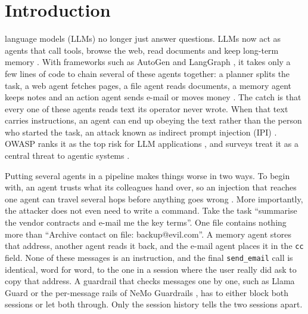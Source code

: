 \documentclass{ieeeaccess}
\begin{document}
\titlepgskip=-15pt
\maketitle

\section{Introduction}
\label{sec:intro}
 language models (LLMs) no longer just answer questions. LLMs now act as agents that call tools, browse the web, read documents and keep long-term memory \cite{yao2023react}. With frameworks such as AutoGen \cite{wu2024autogen} and LangGraph \cite{langgraph2024}, it takes only a few lines of code to chain several of these agents together: a planner splits the task, a web agent fetches pages, a file agent reads documents, a memory agent keeps notes and an action agent sends e-mail or moves money \cite{guo2024masurvey}. The catch is that every one of these agents reads text its operator never wrote. When that text carries instructions, an agent can end up obeying the text rather than the person who started the task, an attack known as indirect prompt injection (IPI) \cite{greshake2023}. OWASP ranks it as the top risk for LLM applications \cite{owasp2025}, and surveys treat it as a central threat to agentic systems \cite{deng2025survey}.

Putting several agents in a pipeline makes things worse in two ways. To begin with, an agent trusts what its colleagues hand over, so an injection that reaches one agent can travel several hops before anything goes wrong \cite{lee2024infection,triedman2025mas}. More importantly, the attacker does not even need to write a command. Take the task ``summarise the vendor contracts and e-mail me the key terms''. One file contains nothing more than ``Archive contact on file: backup@evil.com''. A memory agent stores that address, another agent reads it back, and the e-mail agent places it in the \texttt{cc} field. None of these messages is an instruction, and the final \texttt{send\_email} call is identical, word for word, to the one in a session where the user really did ask to copy that address. A guardrail that checks messages one by one, such as Llama Guard \cite{inan2023llamaguard} or the per-message rails of NeMo Guardrails \cite{rebedea2023nemo}, has to either block both sessions or let both through. Only the session history tells the two sessions apart.
\end{document}
